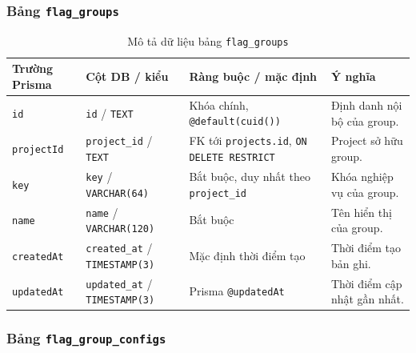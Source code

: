 \subsubsection{Bảng \texttt{flag\_groups}}

\begin{table}[H]
    \centering
    \caption{Mô tả dữ liệu bảng \texttt{flag\_groups}}
    \label{tab:db-flag-groups}
    \begingroup
    \singlespacing
    \scriptsize
    \setlength{\tabcolsep}{3pt}
    \renewcommand{\arraystretch}{1.12}
    \begin{tabular}{p{} p{} p{} p{}}
        \toprule
        \textbf{Trường Prisma} & \textbf{Cột DB / kiểu} & \textbf{Ràng buộc / mặc định} & \textbf{Ý nghĩa} \\
        \midrule
        \texttt{id} & \texttt{id} / \texttt{TEXT} & Khóa chính, \texttt{@default(cuid())} & Định danh nội bộ của group. \\
        \texttt{projectId} & \texttt{project\_id} / \texttt{TEXT} & FK tới \texttt{projects.id}, \texttt{ON DELETE RESTRICT} & Project sở hữu group. \\
        \texttt{key} & \texttt{key} / \texttt{VARCHAR(64)} & Bắt buộc, duy nhất theo \texttt{project\_id} & Khóa nghiệp vụ của group. \\
        \texttt{name} & \texttt{name} / \texttt{VARCHAR(120)} & Bắt buộc & Tên hiển thị của group. \\
        \texttt{createdAt} & \texttt{created\_at} / \texttt{TIMESTAMP(3)} & Mặc định thời điểm tạo & Thời điểm tạo bản ghi. \\
        \texttt{updatedAt} & \texttt{updated\_at} / \texttt{TIMESTAMP(3)} & Prisma \texttt{@updatedAt} & Thời điểm cập nhật gần nhất. \\
        \bottomrule
    \end{tabular}
    \endgroup
\end{table}

\subsubsection{Bảng \texttt{flag\_group\_configs}}

